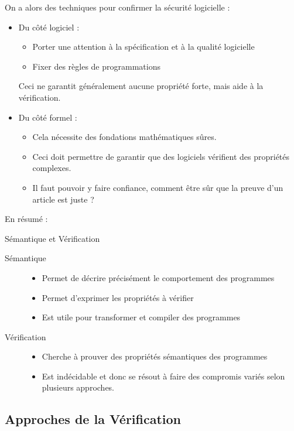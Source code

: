 \documentclass{cours}
\begin{document}
On a alors des techniques pour confirmer la sécurité logicielle : 
\begin{itemize}
    \item Du côté logiciel :
    \begin{itemize}
        \item Porter une attention à la spécification et à la qualité logicielle
        \item Fixer des règles de programmations
    \end{itemize}
    Ceci ne garantit généralement aucune propriété forte, mais aide à la vérification.
    \item Du côté formel :
    \begin{itemize}
        \item Cela nécessite des fondations mathématiques sûres.
        \item Ceci doit permettre de garantir que des logiciels vérifient des propriétés complexes.
        \item Il faut pouvoir y faire confiance, comment être sûr que la preuve d'un article est juste ?
    \end{itemize}
\end{itemize}
En résumé : 
\begin{définition}{Sémantique et Vérification}{}
    \begin{description}
        \item[Sémantique] \begin{itemize}
            \item Permet de décrire précisément le comportement des programmes
            \item Permet d'exprimer les propriétés à vérifier
            \item Est utile pour transformer et compiler des programmes
        \end{itemize} 
        \item[Vérification] \begin{itemize}
            \item Cherche à prouver des propriétés sémantiques des programmes
            \item Est indécidable et donc se résout à faire des compromis variés selon plusieurs approches.
        \end{itemize}
    \end{description}
\end{définition}

\subsection{Approches de la Vérification}
\end{document}
